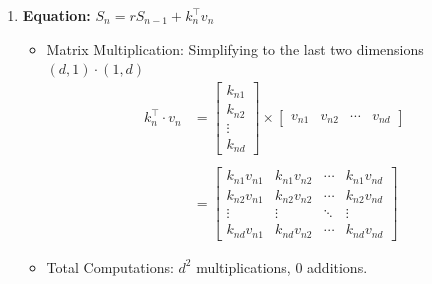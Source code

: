 \documentclass[times, review, 10pt]{elsarticle}
\begin{document}
\begin{enumerate}
    \item[1.] \textbf{Equation:} \(S_n = r S_{n-1} + k_n^{\top} v_n\)
    \begin{itemize}
        \item Matrix Multiplication: Simplifying to the last two dimensions \((d, 1) \cdot (1, d)\)
        \begin{align}
            k_n^{\top} \cdot v_n &=  %
            \begin{bmatrix}
                k_{n1} \\
                k_{n2} \\
                \vdots \\
                k_{nd}
            \end{bmatrix}  
            \times
            \begin{bmatrix}
                v_{n1} & v_{n2} & \cdots & v_{nd}
            \end{bmatrix} \\ \\ 
            &= 
            \begin{bmatrix}
                k_{n1}v_{n1} & k_{n1}v_{n2} & \cdots & k_{n1}v_{nd} \\
                k_{n2}v_{n1} & k_{n2}v_{n2} & \cdots & k_{n2}v_{nd} \\
                \vdots & \vdots & \ddots & \vdots \\
                k_{nd}v_{n1} & k_{nd}v_{n2} & \cdots & k_{nd}v_{nd}
            \end{bmatrix}
            \label{eq:app-retrec-outer}
        \end{align}
        \item Total Computations: \(d^2\) multiplications, 0 additions.
    \end{itemize}


\end{enumerate}
\end{document}
